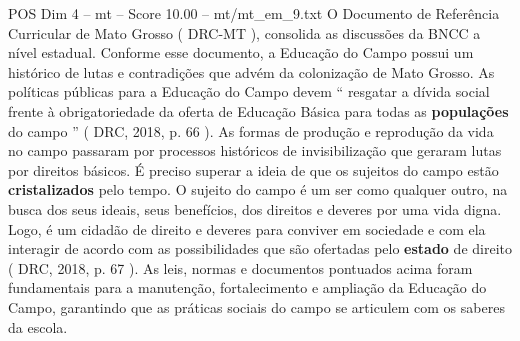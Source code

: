\begin{textsample}{POS Dim 4 – mt – Score 10.00 – mt/mt\_em\_9.txt}
O Documento de Referência Curricular de Mato Grosso ( DRC-MT ), consolida as discussões da BNCC a nível estadual.
Conforme esse documento, a Educação do Campo possui um histórico de lutas e contradições que advém da colonização de Mato Grosso.
As políticas públicas para a Educação do Campo devem “ resgatar a dívida social frente à obrigatoriedade da oferta de Educação Básica para todas as \textbf{populações} do campo ” ( DRC, 2018, p. 66 ).
As formas de produção e reprodução da vida no campo passaram por processos históricos de invisibilização que geraram lutas por direitos básicos.
É preciso superar a ideia de que os sujeitos do campo estão \textbf{cristalizados} pelo tempo.
O sujeito do campo é um ser como qualquer outro, na busca dos seus ideais, seus benefícios, dos direitos e deveres por uma vida digna.
Logo, é um cidadão de direito e deveres para conviver em sociedade e com ela interagir de acordo com as possibilidades que são ofertadas pelo \textbf{estado} de direito ( DRC, 2018, p. 67 ).
As leis, normas e documentos pontuados acima foram fundamentais para a manutenção, fortalecimento e ampliação da Educação do Campo, garantindo que as práticas sociais do campo se articulem com os saberes da escola.

\end{textsample}
